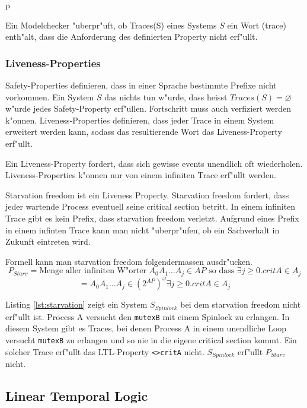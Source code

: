 p\documentclass[a4paper, twoside]{article}
\begin{document}
Ein Modelchecker "uberpr"uft, ob Traces(S) eines Systems $S$ ein Wort (trace) enth"alt, dass die Anforderung des definierten Property nicht erf"ullt.

\subsubsection{Liveness-Properties}
\label{sec:liveness}

Safety-Properties definieren, dass in einer Sprache bestimmte Prefixe nicht vorkommen. Ein System $S$ das nichts tun w"urde, dass heisst $Traces(S)=\varnothing$ w"urde jedes Safety-Property erf"ullen. Fortschritt muss auch verfiziert werden k"onnen. Liveness-Properties definieren, dass jeder Trace in einem System erweitert werden kann, sodass das resultierende Wort das Liveness-Property erf"ullt.

Ein Liveness-Property fordert, dass sich gewisse events unendlich oft wiederholen. Liveness-Properties k"onnen nur von einem infiniten Trace erf"ullt werden. 

Starvation freedom ist ein Liveness Property. Starvation freedom fordert, dass jeder wartende Process eventuell seine critical section betritt. In einem infiniten Trace gibt es kein Prefix, dass starvation freedom verletzt. Aufgrund eines Prefix in einem infinten Trace kann man nicht "uberpr"ufen, ob ein Sachverhalt in Zukunft eintreten wird.

Formell kann man starvation freedom folgendermassen ausdr"ucken.
\[
P_{Starv} = \text{Menge aller infiniten W"orter } A_0 A_1 \dots A_j \in AP \text{ so dass }\exists j \geq 0. critA \in A_j
\]
\[
 = { A_0 A_1 \dots A_j \in (2^{AP})^{\omega} \exists j \geq 0. critA \in A_j}
\]

Listing \ref{lst:starvation} zeigt ein System $S_{Spinlock}$ bei dem starvation freedom nicht erf"ullt ist. Process A versucht den \verb|mutexB| mit einem Spinlock zu erlangen. In diesem System gibt es Traces, bei denen Process A in einem unendliche Loop versucht \verb|mutexB| zu erlangen und so nie in die eigene critical section kommt. Ein solcher Trace erf"ullt das LTL-Property \verb|<>critA| nicht. $S_{Spinlock}$ erf"ullt $P_{Starv}$ nicht.



\subsection{Linear Temporal Logic}
\label{sec:lineartemporallogic}
\end{document}

